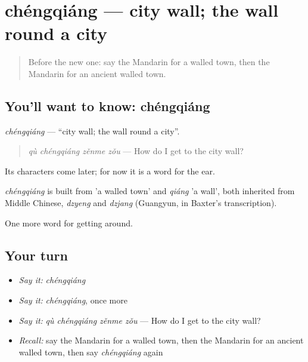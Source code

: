 \section[chéngqiáng]{chéngqiáng — city wall; the wall round a city}

\label{lesson:ZH-C446-chengqiang}



\begin{quote}
Before the new one: say the Mandarin for a walled town, then the Mandarin for an ancient walled town.
\end{quote}

\subsection*{You'll want to know: chéngqiáng}
\emph{chéngqiáng} — \textquotedblleft{}city wall; the wall round a city\textquotedblright{}.

\begin{quote}
\emph{qù chéngqiáng zěnme zǒu} — How do I get to the city wall?
\end{quote}

Its characters come later; for now it is a word for the ear.

\begin{cousinweb}
\emph{chéngqiáng} is built from  'a walled town' and \emph{qiáng} 'a wall', both inherited from Middle Chinese, \emph{dzyeng} and \emph{dzjang} (Guangyun, in Baxter's transcription).
\end{cousinweb}

\begin{grammarlens}[title={What you've built}]
One more word for getting around.
\end{grammarlens}

\subsection*{Your turn}
\begin{itemize}
\raggedright
  \item \emph{Say it:} \emph{chéngqiáng}
  \item \emph{Say it:} \emph{chéngqiáng}, once more
  \item \emph{Say it:} \emph{qù chéngqiáng zěnme zǒu} — How do I get to the city wall?
  \item \emph{Recall:} say the Mandarin for a walled town, then the Mandarin for an ancient walled town, then say \emph{chéngqiáng} again
\end{itemize}


